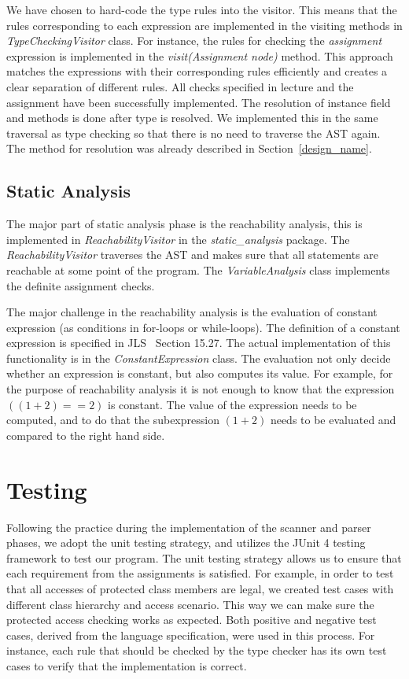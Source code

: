 \documentclass[a4paper, notitlepage]{report}
\begin{document}
We have chosen to hard-code the type rules into the visitor. This means that the rules corresponding to each expression are implemented in the visiting methods in \emph{TypeCheckingVisitor} class. For instance, the rules for checking the \emph{assignment} expression is implemented in the \emph{visit(Assignment node)} method. This approach matches the expressions with their corresponding rules efficiently and creates a clear separation of different rules. All checks specified in lecture and the assignment have been successfully implemented. The resolution of instance field and methods is done after type is resolved. We implemented this in the same traversal as type checking so that there is no need to traverse the AST again. The method for resolution was already described in Section~\ref{design_name}.

\section{Static Analysis}

The major part of static analysis phase is the reachability analysis, this is implemented in \emph{ReachabilityVisitor} in the \emph{static\_analysis} package. The \emph{ReachabilityVisitor} traverses the AST and makes sure that all statements are reachable at some point of the program. The \emph{VariableAnalysis} class  implements the definite assignment checks.

The major challenge in the reachability analysis is the evaluation of constant expression (as conditions in for-loops or while-loops). The definition of a constant expression is specified in JLS~\cite{gosling2000java} Section 15.27. The actual implementation of this functionality is in the \emph{ConstantExpression} class. The evaluation not only decide whether an expression is constant, but also computes its value. For example, for the purpose of reachability analysis it is not enough to know that the expression $((1+2) == 2)$  is constant. The value of the expression needs to be computed, and to do that the subexpression $(1+2)$ needs to be evaluated and compared to the right hand side.

%

\chapter{Testing}
\label{testing}
Following the practice during the implementation of the scanner and parser phases, we adopt the unit testing strategy, and utilizes the JUnit 4 testing framework to test our program. The unit testing strategy allows us to ensure that each requirement from the assignments is satisfied. For example, in order to test that all accesses of protected class members are legal, we created test cases with different class hierarchy and access scenario. This way we can make sure the protected access checking works as expected. Both positive and negative test cases, derived from the language specification, were used in this process. For instance, each rule that should be checked by the type checker has its own test cases to verify that the implementation is correct.
\end{document}
